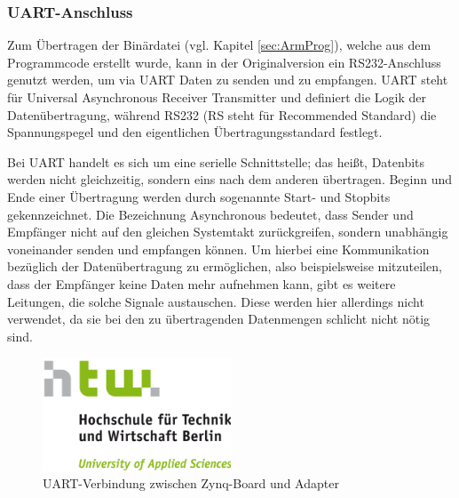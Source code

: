 \documentclass[11pt,a4paper,titlepage]{article}
\begin{document}
\subsubsection{UART-Anschluss}
\label{sec:UART}

Zum Übertragen der Binärdatei (vgl. Kapitel \ref{sec:ArmProg}), welche aus dem Programmcode erstellt wurde, kann in der Originalversion ein RS232-Anschluss genutzt werden, um via UART Daten zu senden und zu empfangen. UART steht für Universal Asynchronous Receiver Transmitter und definiert die Logik der Datenübertragung, während RS232 (RS steht für Recommended Standard) die Spannungspegel und den eigentlichen Übertragungsstandard festlegt.

Bei UART handelt es sich um eine serielle Schnittstelle; das heißt, Datenbits werden nicht gleichzeitig, sondern eins nach dem anderen übertragen. Beginn und Ende einer Übertragung werden durch sogenannte Start- und Stopbits gekennzeichnet. Die Bezeichnung Asynchronous bedeutet, dass Sender und Empfänger nicht auf den gleichen Systemtakt zurückgreifen, sondern unabhängig voneinander senden und empfangen können. Um hierbei eine Kommunikation bezüglich der Datenübertragung zu ermöglichen, also beispielsweise mitzuteilen, dass der Empfänger keine Daten mehr aufnehmen kann, gibt es weitere Leitungen, die solche Signale austauschen. Diese werden hier allerdings nicht verwendet, da sie bei den zu übertragenden Datenmengen schlicht nicht nötig sind.

\begin{figure}[!ht]
\centering
\includegraphics[width=0.5\textwidth]{images/htw_hochschule.png}
\caption{UART-Verbindung zwischen Zynq-Board und Adapter}
\label{img:UART}
\end{figure}
\end{document}

